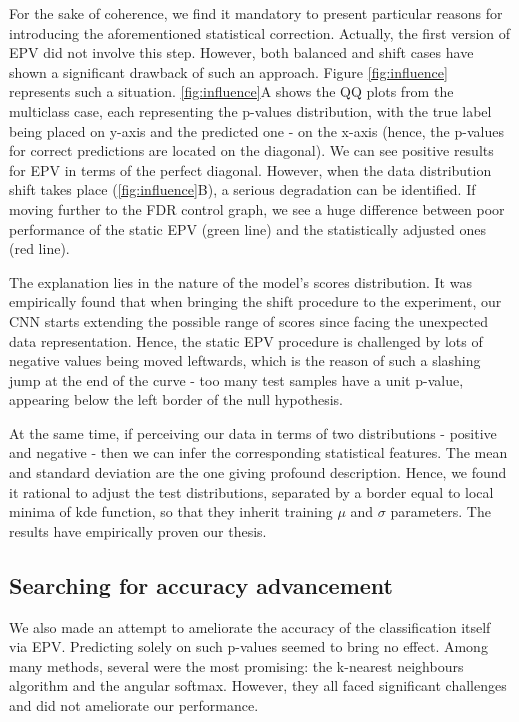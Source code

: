 \documentclass{article}
\begin{document}
For the sake of coherence, we find it mandatory to present particular reasons for introducing the aforementioned statistical correction. Actually, the first version of EPV did not involve this step. However, both balanced and shift cases have shown a significant drawback of such an approach. Figure \ref{fig:influence} represents such a situation. \ref{fig:influence}A shows the QQ plots from the multiclass case, each representing the p-values distribution, with the true label being placed on y-axis and the predicted one - on the x-axis (hence, the p-values for correct predictions are located on the diagonal). We can see positive results for EPV in terms of the perfect diagonal. However, when the data distribution shift takes place (\ref{fig:influence}B), a serious degradation can be identified. If moving further to the FDR control graph, we see a huge difference between poor performance of the static EPV (green line) and the statistically adjusted ones (red line).

The explanation lies in the nature of the  model's scores distribution. It was empirically found that when bringing the shift procedure to the experiment, our CNN starts extending the possible range of scores since facing the unexpected data representation. Hence, the static EPV procedure is challenged by lots of negative values being moved leftwards, which is the reason of such a slashing jump at the end of the curve - too many test samples have a unit p-value, appearing below the left border of the null hypothesis.

At the same time, if perceiving our data in terms of two distributions - positive and negative - then we can infer the corresponding statistical features. The mean and standard deviation are the one giving profound description. Hence, we found it rational to adjust the test distributions, separated by a border equal to local minima of kde function, so that they inherit training $\mu$ and $\sigma$ parameters. The results have empirically proven our thesis.

\subsection{Searching for accuracy advancement}

We also made an attempt to ameliorate the accuracy of the classification itself via EPV. Predicting solely on such p-values seemed to bring no effect. Among many methods, several were the most promising: the k-nearest neighbours algorithm and the angular softmax. However, they all faced significant challenges and did not ameliorate our performance.
\end{document}

